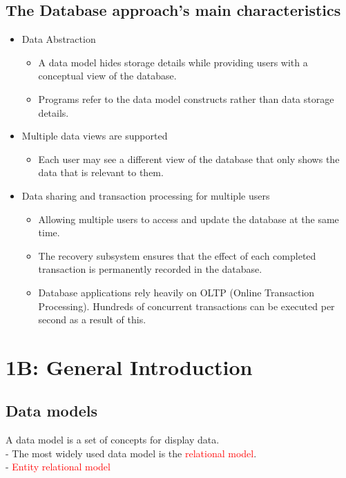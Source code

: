 \documentclass[a4paper, 12pt]{article}
\begin{document}
    \subsection{The Database approach's main characteristics}
    \begin{itemize}
        \item Data Abstraction
            \begin{itemize}
                \item A data model hides storage details while providing users with a conceptual view of the database.
                \item Programs refer to the data model constructs rather than data storage details.
            \end{itemize}
        \item Multiple data views are supported
            \begin{itemize}
                \item Each user may see a different view of the database that only shows the data that is relevant to them.
            \end{itemize}
        \item Data sharing and transaction processing for multiple users
            \begin{itemize}
                \item Allowing multiple users to access and update the database at the same time.
                \item The recovery subsystem ensures that the effect of each completed transaction is permanently recorded in the database.
                \item Database applications rely heavily on OLTP (Online Transaction Processing). 
                Hundreds of concurrent transactions can be executed per second as a result of this.                
            \end{itemize}
    \end{itemize}

\newpage
\section{1B: General Introduction}
    \subsection{Data models}
    A data model is a set of concepts for display data.\\
    - The most widely used data model is the \textcolor{red}{relational model}.\\
    - \textcolor{red}{Entity relational model}
\end{document}
